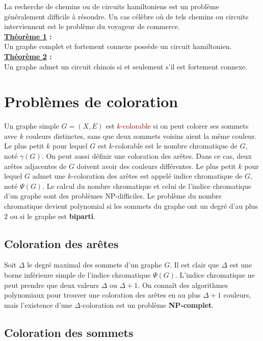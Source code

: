 \documentclass{article}
\newcommand{\red}[1]{\textcolor{darkred}{#1}}
\begin{document}
\noindent La recherche de chemins ou de circuits hamiltoniens est un problème généralement difficile à résoudre. Un cas célèbre où de tels chemins ou circuits interviennent est le 
problème du voyageur de commerce. \\
\textbf{\underline{Théorème 1} :} \\
Un graphe complet et fortement connexe possède un circuit hamiltonien. \\
\textbf{\underline{Théorème 2} :} \\
Un graphe admet un circuit chinois si et seulement s’il est fortement connexe.
\newpage
\section{Problèmes de coloration}

Un graphe simple $G=(X,E)$ est \red{$k$-colorable} si on peut colorer ses sommets avec $k$ couleurs distinctes, sans que deux sommets voisins aient la même couleur. Le plus 
petit $k$ pour lequel $G$ est $k$-colorable est le nombre chromatique de $G$, noté $\gamma(G)$. On peut aussi définir une coloration des arêtes. Dans ce cas, deux arêtes 
adjacentes de $G$ doivent avoir des couleurs différentes. Le plus petit $k$ pour lequel $G$ admet une $k$-coloration des arêtes est appelé indice chromatique de $G$, noté 
$\Psi(G)$. Le calcul du nombre chromatique et celui de l’indice chromatique d’un graphe sont des problèmes NP-difficiles. Le problème du nombre chromatique devient polynomial si 
les sommets du graphe ont un degré d’au plus $2$ ou si le graphe est \textbf{biparti}.

\subsection{Coloration des arêtes}

Soit $\Delta$ le degré maximal des sommets d’un graphe $G$. Il est clair que $\Delta$ est une borne inférieure simple de l’indice chromatique $\Psi(G)$. L’indice chromatique ne 
peut prendre que deux valeurs $\Delta$ ou $\Delta+1$. On connaît des algorithmes polynomiaux pour trouver une coloration des arêtes en au plus $\Delta+1$ couleurs, mais 
l’existence d’une $\Delta$-coloration est un problème \textbf{NP-complet}.

\subsection{Coloration des sommets}
\end{document}
